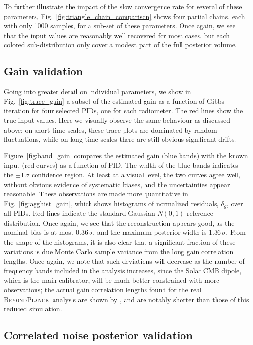 \documentclass[twocolumn]{aa}%
\newcommand{\BP}{\textsc{BeyondPlanck}}
\begin{document}
To further illustrate the impact of the slow convergence rate for
several of these parameters, Fig.~\ref{fig:triangle_chain_comparison}
shows four partial chains, each with only 1000 samples, for a sub-set
of these parameters. Once again, we see that the input values are
reasonably well recovered for most cases, but each colored
sub-distribution only cover a modest part of the full posterior
volume.


\subsection{Gain validation}





Going into greater detail on individual parameters, we show in
Fig.~\ref{fig:trace_gain} a subset of the estimated gain as a function
of Gibbs iteration for four selected PIDs, one for each
radiometer. The red lines show the true input values. Here we visually
observe the same behaviour as discussed above; on short time scales,
these trace plots are dominated by random fluctuations, while on long
time-scales there are still obvious significant drifts.


Figure~\ref{fig:band_gain} compares the estimated gain (blue bands)
with the known input (red curves) as a function of PID. The width of
the blue bands indicates the $\pm1\,\sigma$ confidence region. At
least at a visual level, the two curves agree well, without obvious
evidence of systematic biases, and the uncertainties appear
reasonable. These observations are made more quantitative in
Fig.~\ref{fig:agghist_gain}, which shows histograms of normalized
residuals, $\delta_{g}$, over all PIDs. Red lines indicate the
standard Gaussian $N(0,1)$ reference distribution. Once again, we see
that the reconstruction appears good, as the nominal bias is at most
$0.36\,\sigma$, and the maximum posterior width is
$1.36\,\sigma$. From the shape of the histograms, it is also clear
that a significant fraction of these variations is due Monte Carlo
sample variance from the long gain correlation lengths. Once again, we
note that such deviations will decrease as the number of frequency
bands included in the analysis increases, since the Solar CMB dipole,
which is the main calibrator, will be much better constrained with
more observations; the actual gain correlation lengths found for the
real \BP\ analysis are shown by \citet{bp07}, and are notably shorter
than those of this reduced simulation.


\subsection{Correlated noise posterior validation}
\label{sec:ncorr}
\end{document}
